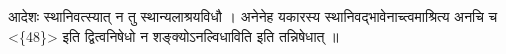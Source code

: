 आदेशः स्थानिवत्स्यात् न तु स्थान्यलाश्रयविधौ । अनेनेह यकारस्य
स्थानिवद्भावेनाच्त्वमाश्रित्य अनचि च \textless{}\{48\}\textgreater{} इति
द्वित्वनिषेधो न शङ्क्योऽनल्विधाविति इति तन्निषेधात् ॥
